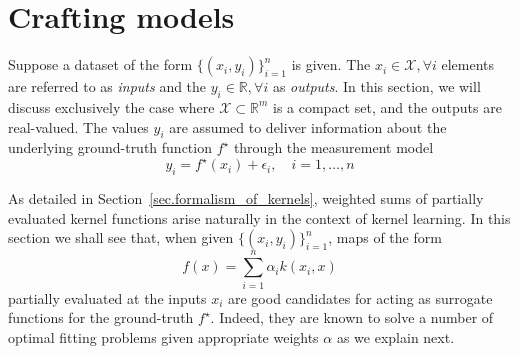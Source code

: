 \section{Crafting models}
\label{sec.crafting_models}

Suppose a dataset of the form $\{(x_i,y_i)\}_{i=1}^n$ is given. The $x_i \in \mathcal{X}, \forall i$ elements are referred to as \textit{inputs} and the $y_i \in \mathbb{R}, \forall i$ as \textit{outputs}. In this section, we will discuss exclusively the case where $\mathcal{X} \subset \mathbb{R}^m$ is a compact set, and the outputs are real-valued. The values $y_i$ are assumed to deliver information about the underlying ground-truth function $f^\star$ through the measurement model
\begin{equation}
	y_i = f^\star(x_i) + \epsilon_i, \quad i=1,\dots,n
\end{equation}


As detailed in Section~\ref{sec.formalism_of_kernels}, weighted sums of partially evaluated kernel functions arise naturally in the context of kernel learning. In this section we shall see that, when given $\{(x_i,y_i)\}_{i=1}^n$, maps of the form
\begin{equation}
	f(x) = \sum_{i=1}^n \alpha_i k(x_i,x)
\end{equation}
partially evaluated at the inputs $x_i$ are good candidates for acting as surrogate functions for the ground-truth $f^\star$. Indeed, they are known to solve a number of optimal fitting problems given appropriate weights $\alpha$ as we explain next.

